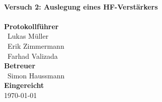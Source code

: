 \documentclass[a4paper, 11pt, oneside]{Thesis}  %
\begin{document}
\begin{titlepage}
\HRule \\[0.4cm]
{ \huge \bfseries Versuch 2: Auslegung eines HF-Verstärkers}\\[0.4cm] %
\HRule \\[1.5cm]
 
\textbf{Protokollführer}\\
{\large\ Lukas Müller}\\[0.2cm]
{\large\ Erik Zimmermann}\\[0.2cm]
{\large\ Farhad Valizada}\\[0.7cm]

\textbf{Betreuer}\\
{\large\ Simon Haussmann}\\[0.2cm]



\textbf{Eingereicht}\\
{\large \today} %
\\[0.2cm]

 

\vfill %

\end{titlepage}

\clearpage

\pagestyle{fancy}
\fancyhf{}
\fancyfoot[C]{\thepage} %
\renewcommand{\headrulewidth}{0pt}

\let\oldchapter\chapter
\renewcommand{\chapter}{\clearpage\pagestyle{fancy}\oldchapter}

\end{document}
